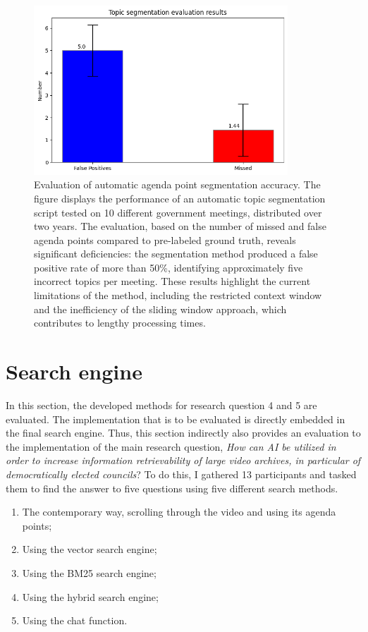 \documentclass[twoside]{uva-inf-bachelor-thesis}
\begin{document}
\begin{figure}[H]
    \centering
    \includegraphics[width=0.85\textwidth]{images/topicSegmentation.png}
    \caption{Evaluation of automatic agenda point segmentation accuracy. The figure displays the performance of an automatic topic segmentation script tested on 10 different government meetings, distributed over two years. The evaluation, based on the number of missed and false agenda points compared to pre-labeled ground truth, reveals significant deficiencies: the segmentation method produced a false positive rate of more than 50\%, identifying approximately five incorrect topics per meeting. These results highlight the current limitations of the method, including the restricted context window and the inefficiency of the sliding window approach, which contributes to lengthy processing times.}
    \label{fig:agendaSegmResults}
\end{figure}

\section{Search engine}\label{sec:searchEngineExp}
In this section, the developed methods for research question 4 and 5 are evaluated. The implementation that is to be evaluated is directly embedded in the final search engine. Thus, this section indirectly also provides an evaluation to the implementation of the main research question, \textit{How can AI be utilized in order to increase information retrievability of large video archives, in particular of democratically elected councils}?
To do this, I gathered 13 participants and tasked them to find the answer to five questions using five different search methods.

\begin{enumerate}
    \item The contemporary way, scrolling through the video and using its agenda points;
    \item Using the vector search engine;
    \item Using the BM25 search engine;
    \item Using the hybrid search engine;
    \item Using the chat function.
\end{enumerate}
\end{document}
